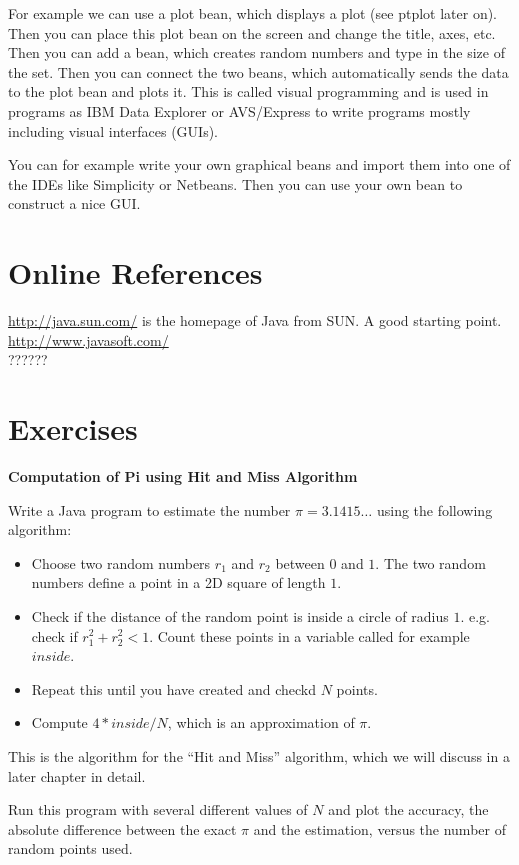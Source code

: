 For example we can use a plot bean, which displays a plot (see
ptplot later on). Then you can place this plot bean on the screen
and change the title, axes, etc. Then you can add a bean, which
creates random numbers and type in the size of the set. Then
you can connect the two beans, which automatically sends the
data to the plot bean and plots it. This is called visual 
programming and is used in programs as IBM Data Explorer or
AVS/Express to write programs mostly including visual 
interfaces (GUIs).

You can for example write your own graphical beans and import them 
into one of the IDEs like Simplicity or Netbeans. Then you can 
use your own bean to construct a nice GUI.


\section{Online References}
\label{sec:OnlineReferences}

\href{http://java.sun.com/}{http://java.sun.com/} is the homepage of
Java from SUN. A good starting point. \\

\href{http://www.javasoft.com/}{http://www.javasoft.com/} \\

??????


\section{Exercises}

\begin{Ex}
\label{PiCalculation}
\textbf{Computation of Pi using Hit and Miss Algorithm}

Write a Java program to estimate the number $\pi=3.1415\ldots$ using
the following algorithm:
\begin{itemize}
\item Choose two random numbers $r_1$ and $r_2$ between $0$ and $1$.
  The two random numbers define a point in a 2D square of length $1$.
\item Check if the distance of the random point is inside a circle
  of radius $1$. e.g. check if $r_1^2+r_2^2 < 1$. Count these points
  in a variable called for example $inside$.
\item Repeat this until you have created and checkd $N$ points.
\item Compute $4*inside/N$, which is an approximation of $\pi$.
\end{itemize}
This is the algorithm for the ``Hit and Miss'' algorithm, which we will
discuss in a later chapter in detail.

Run this program with several different values of $N$ and plot the
accuracy, the absolute difference between the exact $\pi$ and
the estimation, versus the number of random points used.
\end{Ex}

